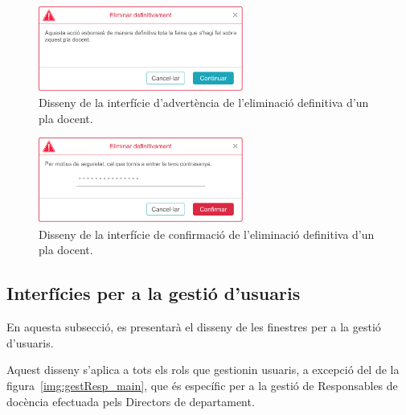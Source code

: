 \documentclass[a4paper,12pt]{ThesisStyle}
\begin{document}
\begin{figure}[H]
	\centering
	\includegraphics[width=0.6\textwidth]{assets/interfaces/administradors/plansDocents/esborrarBox.pdf}
	\caption{\label{img:plansDocents_esborrarBox}Disseny de la interfície d'advertència de l'eliminació definitiva d'un pla docent.}
\end{figure}

\begin{figure}[H]
	\centering
	\includegraphics[width=0.6\textwidth]{assets/interfaces/administradors/plansDocents/confirmarEsborrarBox.pdf}
	\caption{\label{img:plansDocents_confirmarEsborrarBox}Disseny de la interfície de confirmació de l'eliminació definitiva d'un pla docent.}
\end{figure}

\subsection{Interfícies per a la gestió d'usuaris}
\label{subsec:interficies_gestio_usuaris}

En aquesta subsecció, es presentarà el disseny de les finestres per a la gestió d'usuaris.

Aquest disseny s'aplica a tots els rols que gestionin usuaris, a excepció del de la figura~\ref{img:gestResp_main}, que és específic per a la gestió de Responsables de docència efectuada pels Directors de departament.
\end{document}
